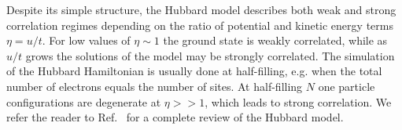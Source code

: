 Despite its simple structure, the Hubbard model describes both weak and strong 
correlation regimes depending on the ratio of potential and kinetic energy 
terms $\eta = u / t$. For low values of $\eta \sim 1$ the ground state is 
weakly correlated, while as $u / t$ grows the solutions of the model may be 
strongly correlated. The simulation of the Hubbard Hamiltonian is usually done 
at half-filling, e.g. when the total number of electrons equals the number of 
sites. At half-filling $N$ one particle configurations are degenerate at $\eta 
>> 1$, which leads to strong correlation. We refer the reader to 
Ref.~\cite{essler2005one} for a complete review of the Hubbard model.
